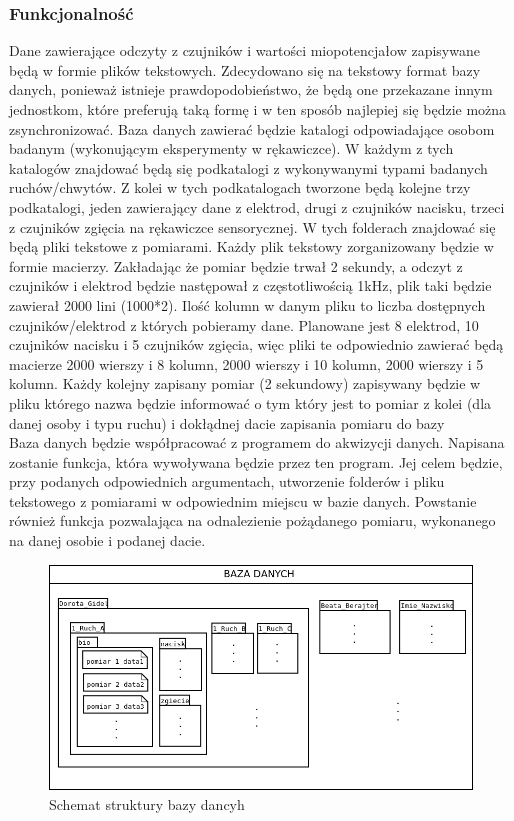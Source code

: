 \documentclass{article}
\begin{document}
\subsubsection{Funkcjonalność}
Dane zawierające odczyty z czujników i wartości miopotencjałow zapisywane będą w formie plików tekstowych. Zdecydowano się na tekstowy format bazy danych, ponieważ istnieje prawdopodobieństwo, że będą one przekazane innym jednostkom, które preferują taką formę i w ten sposób najlepiej się będzie można zsynchronizować. Baza danych zawierać będzie katalogi odpowiadające osobom badanym (wykonującym eksperymenty w rękawiczce). W każdym z tych katalogów znajdować będą się podkatalogi z wykonywanymi typami badanych ruchów/chwytów. Z kolei w tych podkatalogach tworzone będą kolejne trzy podkatalogi, jeden zawierający dane z elektrod, drugi z czujników nacisku, trzeci z czujników zgięcia na rękawiczce sensorycznej. W tych folderach znajdować się będą pliki tekstowe z pomiarami. Każdy plik tekstowy zorganizowany będzie w formie macierzy. Zakładając że pomiar będzie trwał 2 sekundy, a odczyt z czujników i elektrod będzie następował z częstotliwością 1kHz, plik taki będzie zawierał 2000 lini (1000*2). Ilość kolumn w danym pliku to liczba dostępnych czujników/elektrod z których pobieramy dane. Planowane jest 8 elektrod, 10 czujników nacisku i 5 czujników zgięcia, więc pliki te odpowiednio zawierać będą macierze 2000 wierszy i 8 kolumn, 2000 wierszy i 10 kolumn, 2000 wierszy i 5 kolumn. Każdy kolejny zapisany pomiar (2 sekundowy) zapisywany będzie w pliku którego nazwa będzie informować o tym który jest to pomiar z kolei (dla danej osoby i typu ruchu) i dokłądnej dacie zapisania pomiaru do bazy\\
Baza danych będzie współpracować z programem do akwizycji danych. Napisana zostanie funkcja, która wywoływana będzie przez ten program. Jej celem będzie, przy podanych odpowiednich argumentach, utworzenie folderów i pliku tekstowego z pomiarami w odpowiednim miejscu w bazie danych. Powstanie również funkcja pozwalająca na odnalezienie pożądanego pomiaru, wykonanego na danej osobie i podanej dacie.

\begin{figure}[ht!]
\label{fig:baza_danych}
\centering
\includegraphics[width=14cm]{baza_danych.png}
\caption {Schemat struktury bazy dancyh}
\end{figure}
\end{document}
